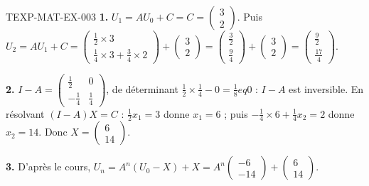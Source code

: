 \begin{corrige}{TEXP-MAT-EX-003}
\textbf{1.} $U_1=AU_0+C=C=\begin{pmatrix}3\\2\end{pmatrix}$. Puis $U_2=AU_1+C=\begin{pmatrix}\tfrac{1}{2}\times3\\\tfrac{1}{4}\times3+\tfrac{3}{4}\times2\end{pmatrix}+\begin{pmatrix}3\\2\end{pmatrix}=\begin{pmatrix}\tfrac{3}{2}\\\tfrac{9}{4}\end{pmatrix}+\begin{pmatrix}3\\2\end{pmatrix}=\begin{pmatrix}\tfrac{9}{2}\\\tfrac{17}{4}\end{pmatrix}$.

\textbf{2.} $I-A=\begin{pmatrix}\tfrac{1}{2}&0\\-\tfrac{1}{4}&\tfrac{1}{4}\end{pmatrix}$, de déterminant $\tfrac{1}{2}\times\tfrac{1}{4}-0=\tfrac{1}{8}
eq0$ : $I-A$ est inversible. En résolvant $(I-A)X=C$ : $\tfrac{1}{2}x_1=3$ donne $x_1=6$ ; puis $-\tfrac{1}{4}\times6+\tfrac{1}{4}x_2=2$ donne $x_2=14$. Donc $X=\begin{pmatrix}6\\14\end{pmatrix}$.

\textbf{3.} D'après le cours, $U_n=A^n(U_0-X)+X=A^n\begin{pmatrix}-6\\-14\end{pmatrix}+\begin{pmatrix}6\\14\end{pmatrix}$.
\end{corrige}
